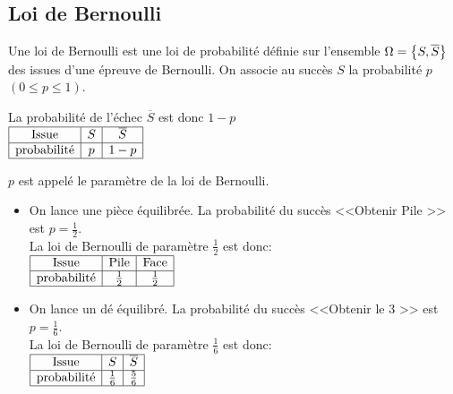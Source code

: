 \subsection*{Loi de Bernoulli}
\begin{definition}
  Une  loi de Bernoulli  est  une loi de probabilité définie sur l'ensemble $ \Omega=\left\{S, \overline{S}\right\} $ des issues d'une épreuve de Bernoulli.
  On associe  au succès $S$ la probabilité $ p $\; $ (0\leq p\leq 1)$.
  
   La probabilité de l'échec $ \overline{S} $  est donc $ 1-p $\\
  
  
   $\begin{array}{|c|c|c|c|c|}
\hline
 \text{Issue} &  S & \overline{S}    \\
 \hline
\text{probabilité} &  p &  1-p  \\
\hline
\end{array}$
 
  $ p $  est appelé le paramètre de la loi de Bernoulli.
  \end{definition}
  \begin{example}
  \begin{itemize}
 \item  On lance une pièce équilibrée. La probabilité du succès <<Obtenir Pile >> est $ p=\frac{1}{2} $.\\La loi de Bernoulli de paramètre $ \frac{1}{2} $  est donc:\\
 
   $\begin{array}{|c|c|c|c|c|}
\hline
\text{Issue} & \text{Pile} &\text{Face}  \\
 \hline
\text{probabilité} &  \frac{1}{2} &  \frac{1}{2}   \\
\hline
\end{array}$


\item  On lance un dé équilibré. La probabilité du succès <<Obtenir le 3 >> est $ p=\frac{1}{6} $.\\La loi de Bernoulli de paramètre $ \frac{1}{6} $  est  donc:\\
 $\begin{array}{|c|c|c|c|c|}
\hline
 \text{Issue} &  S & \overline{S}    \\
 \hline
\text{probabilité} &  \frac{1}{6} &  \frac{5}{6}   \\
\hline
\end{array}$
\end{itemize}
  \end{example}

